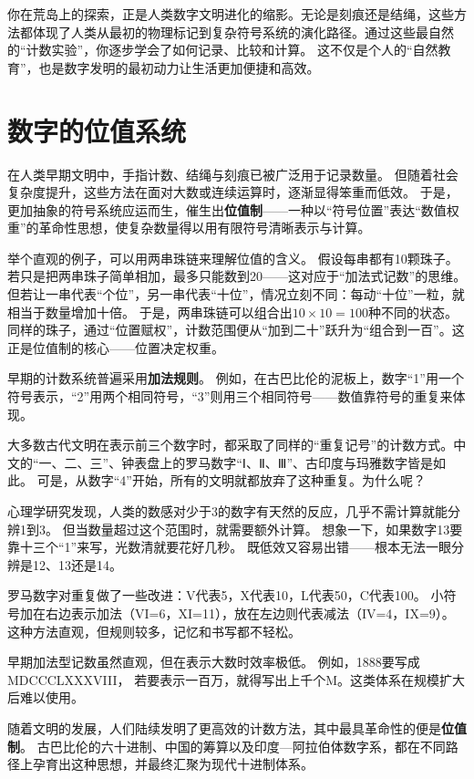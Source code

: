 你在荒岛上的探索，正是人类数字文明进化的缩影。无论是刻痕还是结绳，这些方法都体现了人类从最初的物理标记到复杂符号系统的演化路径。通过这些最自然的“计数实验”，你逐步学会了如何记录、比较和计算。
这不仅是个人的“自然教育”，也是数字发明的最初动力让生活更加便捷和高效。


\section{数字的位值系统}

在人类早期文明中，手指计数、结绳与刻痕已被广泛用于记录数量。  
但随着社会复杂度提升，这些方法在面对大数或连续运算时，逐渐显得笨重而低效。  
于是，更加抽象的符号系统应运而生，催生出{\bf 位值制}——一种以“符号位置”表达“数值权重”的革命性思想，使复杂数量得以用有限符号清晰表示与计算。



举个直观的例子，可以用两串珠链来理解位值的含义。  
假设每串都有10颗珠子。  
若只是把两串珠子简单相加，最多只能数到20——这对应于“加法式记数”的思维。  
但若让一串代表“个位”，另一串代表“十位”，情况立刻不同：每动“十位”一粒，就相当于数量增加十倍。  
于是，两串珠链可以组合出$10\times10=100$种不同的状态。  
同样的珠子，通过“位置赋权”，计数范围便从“加到二十”跃升为“组合到一百”。这正是位值制的核心——位置决定权重。



早期的计数系统普遍采用{\bf 加法规则}。  
例如，在古巴比伦的泥板上，数字“1”用一个符号表示，“2”用两个相同符号，“3”则用三个相同符号——数值靠符号的重复来体现。

大多数古代文明在表示前三个数字时，都采取了同样的“重复记号”的计数方式。中文的“一、二、三”、钟表盘上的罗马数字“Ⅰ、Ⅱ、Ⅲ”、古印度与玛雅数字皆是如此。  
可是，从数字“4”开始，所有的文明就都放弃了这种重复。为什么呢？  

心理学研究发现，人类的数感对少于3的数字有天然的反应，几乎不需计算就能分辨1到3。  
但当数量超过这个范围时，就需要额外计算。  
想象一下，如果数字13要靠十三个“1”来写，光数清就要花好几秒。  
既低效又容易出错——根本无法一眼分辨是12、13还是14。

罗马数字对重复做了一些改进：V代表5，X代表10，L代表50，C代表100。  
小符号加在右边表示加法（VI=6，XI=11），放在左边则代表减法（IV=4，IX=9）。  
这种方法直观，但规则较多，记忆和书写都不轻松。

早期加法型记数虽然直观，但在表示大数时效率极低。  
例如，1888要写成MDCCCLXXXVIII， 若要表示一百万，就得写出上千个M。这类体系在规模扩大后难以使用。

随着文明的发展，人们陆续发明了更高效的计数方法，其中最具革命性的便是{\bf 位值制}。  
古巴比伦的六十进制、中国的筹算以及印度—阿拉伯体数字系，都在不同路径上孕育出这种思想，并最终汇聚为现代十进制体系。

